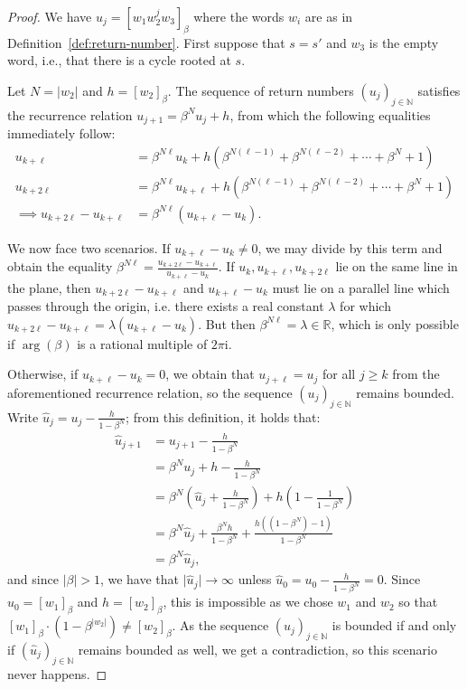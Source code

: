\documentclass[10pt,a4paper]{amsart}
\newcommand{\N}{\mathbb{N}}
\newcommand{\R}{\mathbb{R}}
\newcommand{\ii}{\mathrm{i}}
\begin{document}
\begin{proof}

We have $u_j=[w_1w_2^j w_3]_\beta$ where the words $w_i$ are as in Definition~\ref{def:return-number}. First suppose that $s=s'$ and $w_3$ is the empty word, i.e., that there is a cycle rooted at $s$.

    Let $N=\lvert w_2\rvert$ and $h=[w_2]_\beta$. The sequence of return numbers $(u_j)_{j\in\N}$  satisfies the recurrence relation $u_{j+1} = \beta^N u_j + h$, from which the following equalities immediately follow:
        \begin{align*}
            u_{k+\ell} &= \beta^{N\ell}u_k+h(\beta^{N(\ell - 1)} + \beta^{N(\ell-2)} + \cdots + \beta ^N + 1)  \\
            u_{k+2\ell} &= \beta^{N\ell}u_{k+\ell}+h(\beta^{N(\ell - 1)} + \beta^{N(\ell-2)} + \cdots + \beta ^N + 1)  \\
            {}\implies u_{k+2\ell}-u_{k+\ell} &= \beta^{N\ell}(u_{k+\ell}-u_k).
        \end{align*}
        
    We now face two scenarios. If $u_{k+\ell}-u_k\ne 0$, we may divide by this term and obtain the equality $\beta^{N\ell}=\frac{u_{k+2\ell}-u_{k+\ell}}{u_{k+\ell}-u_k}$. If $u_k,u_{k+\ell},u_{k+2\ell}$ lie on the same line in the plane, then $u_{k+2\ell}-u_{k+\ell}$ and $u_{k+\ell}-u_{k}$ must lie on a parallel line which passes through the origin, i.e. there exists a real constant $\lambda$ for which $u_{k+2\ell}-u_{k+\ell} = \lambda(u_{k+\ell}-u_{k})$. But then $\beta^{N\ell}=\lambda\in\R$, which is only possible if $\arg(\beta)$ is a rational multiple of $2\pi\ii$. 
    

    Otherwise, if $u_{k+\ell}-u_k=0$, we obtain that $u_{j+\ell}=u_j$ for all $j\ge k$ from the aforementioned recurrence relation, so the sequence $(u_j)_{j\in\N}$ remains bounded. Write $\hat{u}_j=u_j-\frac{h}{1-\beta^N}$; from this definition, it holds that:
        \begin{align*}
            \hat{u}_{j+1}&=u_{j+1}-\frac{h}{1-\beta^N}\\
            &=\beta^N u_j+h-\frac{h}{1-\beta^N} \\
            &=\beta^N\left(\hat{u}_j+\frac{h}{1-\beta^N}\right)+h\left( 1-\frac{1}{1-\beta^N}\right)\\
            &=\beta^N\hat{u}_j+\frac{\beta^Nh}{1-\beta^N} + \frac{h((1-\beta^N)-1)}{1-\beta^N}\\
            &=\beta^N\hat{u}_j,
        \end{align*}
    and since $\lvert\beta\rvert>1$, we have that $\lvert \hat{u}_j\rvert\to\infty$ unless $\hat{u}_0=u_0-\frac{h}{1-\beta^N}=0$. Since $u_0=[w_1]_\beta$ and $h=[w_2]_\beta$, this is impossible as we chose $w_1$ and $w_2$ so that $[w_1]_\beta \cdot (1-\beta^{\lvert w_2\rvert}) \ne  [w_2]_\beta$. As the sequence $(u_j)_{j\in\N}$ is bounded if and only if $(\hat{u}_j)_{j\in\N}$ remains bounded as well, we get a contradiction, so this scenario never happens.
    

\end{proof}
\end{document}
